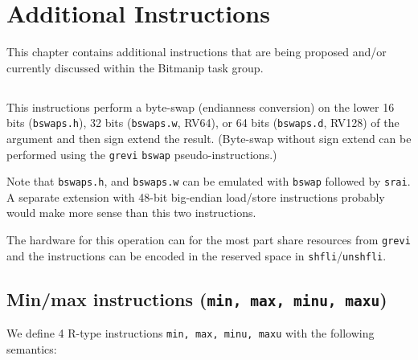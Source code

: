 \chapter{Additional Instructions}

This chapter contains additional instructions that are being proposed and/or
currently discussed within the Bitmanip task group.


\section{}

This instructions perform a byte-swap (endianness conversion) on the lower 16 bits
(\texttt{bswaps.h}), 32 bits (\texttt{bswaps.w}, RV64), or 64 bits (\texttt{bswaps.d}, RV128)
of the argument and then sign extend the result. (Byte-swap without sign extend can be
performed using the \texttt{grevi} \texttt{bswap} pseudo-instructions.)

Note that \texttt{bswaps.h}, and \texttt{bswaps.w} can be emulated with
\texttt{bswap} followed by \texttt{srai}. A separate extension with 48-bit big-endian
load/store instructions probably would make more sense than this two instructions.



The hardware for this operation can for the most part share resources from
\texttt{grevi} and the instructions can be encoded in the reserved space in \texttt{shfli}/\texttt{unshfli}.




\section{Min/max instructions (\texttt{min, max, minu, maxu})}

We define 4 R-type instructions \texttt{min, max, minu, maxu} with the
following semantics:







